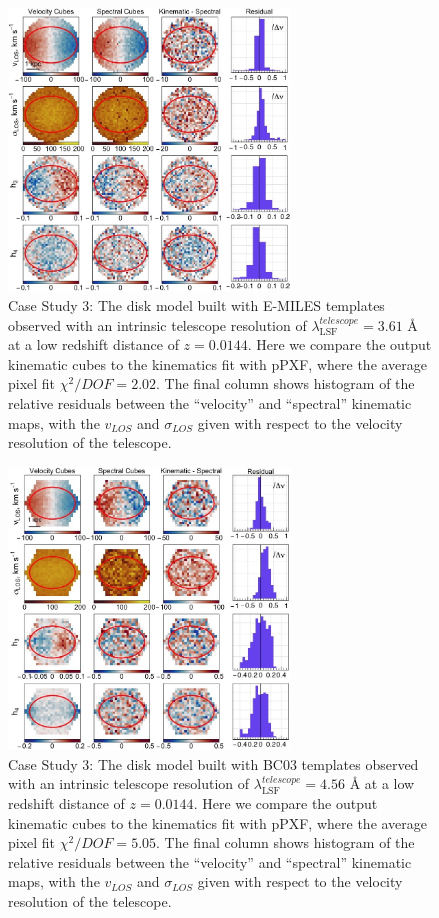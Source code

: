 \documentclass[
  journal=pasa,
  manuscript=research-paper, %
  year=2020,
  volume=37,
]{cup-journal}
\begin{document}

\begin{figure}
    \centering
    \includegraphics[keepaspectratio, width=7.5cm]{cs3_disk_velocities_lowz_fwhm_EMILES.jpeg}
    \caption{Case Study 3: The disk model built with E-MILES templates observed with an intrinsic telescope resolution of  $\lambda_{\text{LSF}}^{telescope} = 3.61$ \AA{} at a low redshift distance of $z = 0.0144$. Here we compare the output kinematic cubes to the kinematics fit with pPXF, where the average pixel fit $\chi^2/DOF = 2.02$. The final column shows histogram of the relative residuals between the ``velocity'' and ``spectral'' kinematic maps, with the $v_{LOS}$ and $\sigma_{LOS}$ given with respect to the velocity resolution of the telescope.}
    \label{fig:cs3_disk_lowz_E-MILES}
\end{figure}

\begin{figure}
    \centering
    \includegraphics[keepaspectratio, width=7.5cm]{cs3_disk_velocities_lowz_fwhm_BC03.jpeg}
    \caption{Case Study 3: The disk model built with BC03 templates observed with an intrinsic telescope resolution of  $\lambda_{\text{LSF}}^{telescope} = 4.56$ \AA{} at a low redshift distance of $z = 0.0144$. Here we compare the output kinematic cubes to the kinematics fit with pPXF, where the average pixel fit $\chi^2/DOF = 5.05$. The final column shows histogram of the relative residuals between the ``velocity'' and ``spectral'' kinematic maps, with the $v_{LOS}$ and $\sigma_{LOS}$ given with respect to the velocity resolution of the telescope.}
    \label{fig:cs3_disk_lowz_BC03}
\end{figure}
\end{document}
